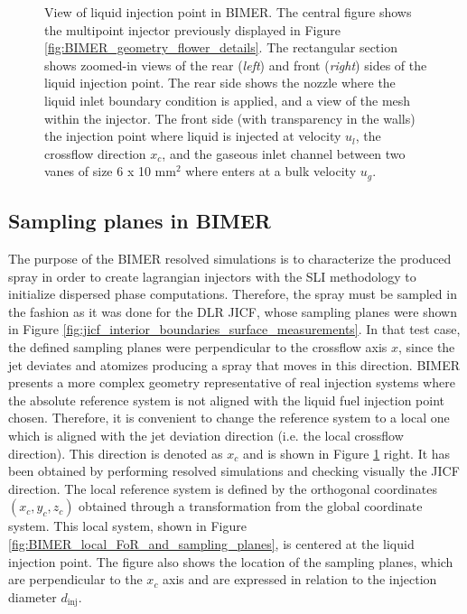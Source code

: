 \begin{figure}[h!]
	\centering
	\caption[View of liquid injection point in BIMER]{View of liquid injection point in BIMER. The central figure shows the multipoint injector previously displayed in Figure \ref{fig:BIMER_geometry_flower_details}. The rectangular section shows zoomed-in views of the rear (\textsl{left}) and front (\textsl{right}) sides of the liquid injection point. The rear side shows the nozzle where the liquid inlet boundary condition is applied, and a view of the mesh within the injector. The front side (with transparency in the walls) the injection point where liquid is injected at velocity $u_l$, the crossflow direction $x_c$, and the gaseous inlet channel between two vanes of size 6 x 10 mm$^2$ where enters at a bulk velocity $u_g$.}%
	\label{fig:BIMER_liquid_injector_views}
\end{figure}

\subsection*{Sampling planes in BIMER}

The purpose of the BIMER resolved simulations is to characterize the produced spray in order to create lagrangian injectors with the SLI methodology to initialize dispersed phase computations. Therefore, the spray must be sampled in the fashion as it was done for the DLR JICF, whose sampling planes were shown in Figure \ref{fig:jicf_interior_boundaries_surface_measurements}. In that test case, the defined sampling planes were perpendicular to the crossflow axis $x$, since the jet deviates and atomizes producing a spray that moves in this direction. BIMER presents a more complex geometry representative of real injection systems where the absolute reference system is not aligned with the liquid fuel injection point chosen. Therefore, it is convenient to change the reference system to a local one which is aligned with the jet deviation direction (i.e. the local crossflow direction). This direction is denoted as $x_c$ and is shown in Figure \ref{fig:BIMER_liquid_injector_views} right. It has been obtained by performing resolved simulations and checking visually the JICF direction. The local reference system is defined by the orthogonal coordinates $\left( x_c, y_c, z_c \right)$ obtained through a transformation from the global coordinate system. This local system, shown in Figure \ref{fig:BIMER_local_FoR_and_sampling_planes}, is centered at the liquid injection point. The figure also shows the location of the sampling planes, which are perpendicular to the $x_c$ axis and are expressed in relation to the injection diameter $d_\mathrm{inj}$.

